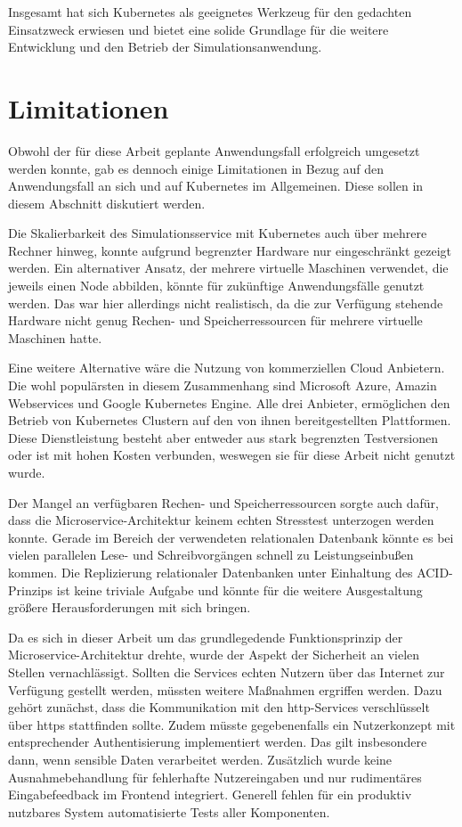 \documentclass[11pt,a4paper]{article}
\begin{document}
Insgesamt hat sich Kubernetes als geeignetes Werkzeug für den gedachten Einsatzweck erwiesen 
und bietet eine solide Grundlage für die weitere Entwicklung und den Betrieb der Simulationsanwendung.


\section{Limitationen}
Obwohl der für diese Arbeit geplante Anwendungsfall erfolgreich umgesetzt werden konnte,
gab es dennoch einige Limitationen in Bezug auf den Anwendungsfall an sich und auf
Kubernetes im Allgemeinen. Diese sollen in diesem Abschnitt diskutiert werden.

Die Skalierbarkeit des Simulationsservice mit Kubernetes auch über mehrere Rechner hinweg,
konnte aufgrund begrenzter Hardware nur eingeschränkt gezeigt werden. Ein alternativer Ansatz,
der mehrere virtuelle Maschinen verwendet, die jeweils einen Node abbilden, könnte 
für zukünftige Anwendungsfälle genutzt werden. Das war hier allerdings nicht realistisch,
da die zur Verfügung stehende Hardware nicht genug Rechen- und Speicherressourcen
für mehrere virtuelle Maschinen hatte.

Eine weitere Alternative wäre die Nutzung von kommerziellen Cloud Anbietern.
Die wohl populärsten in diesem Zusammenhang sind Microsoft Azure,
Amazin Webservices und Google Kubernetes Engine. Alle drei Anbieter,
ermöglichen den Betrieb von Kubernetes Clustern auf den von 
ihnen bereitgestellten Plattformen. Diese Dienstleistung
besteht aber entweder aus stark begrenzten Testversionen oder
ist mit hohen Kosten verbunden, weswegen sie für diese Arbeit nicht genutzt wurde.

Der Mangel an verfügbaren Rechen- und Speicherressourcen sorgte auch dafür,
dass die Microservice-Architektur keinem echten Stresstest unterzogen werden konnte.
Gerade im Bereich der verwendeten relationalen Datenbank könnte es bei vielen
parallelen Lese- und Schreibvorgängen schnell zu Leistungseinbußen kommen.
Die Replizierung relationaler Datenbanken unter Einhaltung des ACID-Prinzips
ist keine triviale Aufgabe und könnte für die weitere Ausgestaltung 
größere Herausforderungen mit sich bringen.

Da es sich in dieser Arbeit um das grundlegedende Funktionsprinzip der Microservice-Architektur drehte,
wurde der Aspekt der Sicherheit an vielen Stellen vernachlässigt. Sollten die Services echten
Nutzern über das Internet zur Verfügung gestellt werden, müssten weitere Maßnahmen ergriffen werden.
Dazu gehört zunächst, dass die Kommunikation mit den http-Services verschlüsselt über https
stattfinden sollte. Zudem müsste gegebenenfalls ein Nutzerkonzept mit entsprechender
Authentisierung implementiert werden. Das gilt insbesondere dann, wenn sensible
Daten verarbeitet werden. Zusätzlich wurde keine Ausnahmebehandlung für fehlerhafte
Nutzereingaben und nur rudimentäres Eingabefeedback im Frontend integriert.
Generell fehlen für ein produktiv nutzbares System automatisierte Tests
aller Komponenten.
\end{document}

